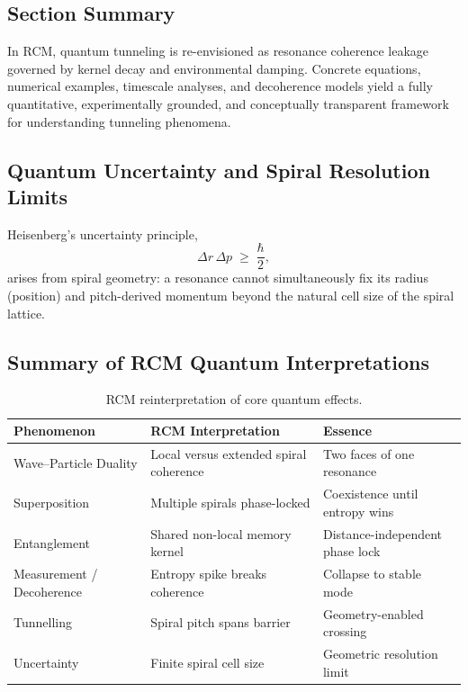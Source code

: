 \subsection{Section Summary}

In RCM, quantum tunneling is re-envisioned as resonance coherence leakage governed by kernel decay and environmental damping.  Concrete equations, numerical examples, timescale analyses, and decoherence models yield a fully quantitative, experimentally grounded, and conceptually transparent framework for understanding tunneling phenomena.


\subsection{Quantum Uncertainty and Spiral Resolution Limits}

Heisenberg’s uncertainty principle,
\[
\Delta r \,\Delta p \;\ge\; \frac{\hbar}{2},
\]
arises from spiral geometry: a resonance cannot simultaneously fix its radius
(position) and pitch-derived momentum beyond the natural cell size of the
spiral lattice.

\subsection{Summary of RCM Quantum Interpretations}

\begin{table}[h]
\centering
\begin{tabular}{p{} p{} p{}}
\toprule
\textbf{Phenomenon} & \textbf{RCM Interpretation} & \textbf{Essence} \\
\midrule
Wave–Particle Duality & Local versus extended spiral coherence & Two faces of one resonance \\[2pt]
Superposition & Multiple spirals phase-locked & Coexistence until entropy wins \\[2pt]
Entanglement & Shared non-local memory kernel & Distance-independent phase lock \\[2pt]
Measurement / Decoherence & Entropy spike breaks coherence & Collapse to stable mode \\[2pt]
Tunnelling & Spiral pitch spans barrier & Geometry-enabled crossing \\[2pt]
Uncertainty & Finite spiral cell size & Geometric resolution limit \\[2pt]
\bottomrule
\end{tabular}
\caption{RCM reinterpretation of core quantum effects.}
\end{table}

